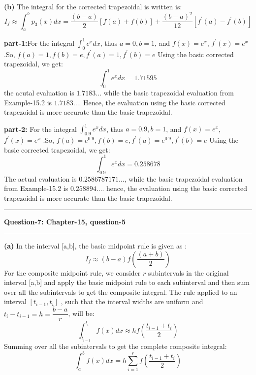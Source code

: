 \documentclass{article}
\newcommand\question[2]{\vspace{.25in}\hrule\textbf{#1: #2}\hrule\vspace{.10in}}
\renewcommand\part[1]{\vspace{.10in}\textbf{(#1)}}
\begin{document}
  \part{b} The integral for the corrected trapezoidal is written is:
  \[ I_f \approx \int_{a}^{b} p_3(x)dx = \dfrac{(b-a)}{2}[f(a) + f(b)] + \dfrac{(b-a)^2}{12}[f^\prime(a) - f^\prime(b)] \]

  \textbf {part-1:}For the integral $\int_{0}^{1}e^x dx$, thus $a=0,b=1$, and $f(x) = e^x$, $f^\prime(x) = e^x$ .So, $f(a)=1,f(b)=e,f^\prime(a)=1, f^\prime(b)=e$ \newline
  Using the basic corrected trapezoidal, we get:
  \[\int_{0}^{1}e^x dx = 1.71595\]
  the acutal evaluation is $1.7183\dots$ while the basic trapezoidal evaluation from Example-15.2 is $1.7183\dots$. Hence, the evaluation using the basic corrected trapezoidal is more accurate than the basic trapezoidal. \newline

  \textbf {part-2:} For the integral $\int_{0.9}^{1}e^x dx$, thus $a=0.9,b=1$, and $f(x) = e^x$, $f^\prime(x) = e^x$ .So, $f(a)=e^{0.9},f(b)=e,f^\prime(a)=e^{0.9}, f^\prime(b)=e$ \newline
  Using the basic corrected trapezoidal, we get:
  \[\int_{0.9}^{1}e^x dx = 0.258678\]
  The actual evaluation is $0.2586787171\dots$, while the basic trapezoidal evaluation from Example-15.2 is $0.258894\dots$. hence, the evaluation using the basic corrected trapezoidal is more accurate than the basic trapezoidal. \newline

  \question{Question-7}{Chapter-15, question-5}
  \part{a} In the interval [a,b], the basic midpoint rule is given as :
  \begin{equation}
	  I_f \approx (b-a)f(\dfrac{(a+b)}{2})
	  \label{eq:bmid}
  \end{equation}
  For the composite midpoint rule, we consider $r$ subintervals in the original interval [a,b] and apply the basic midpoint rule to each subinterval and then sum over all the subintervals to get the composite integral. The rule applied to an interval $[t_{i-1},t_i]$ , such that the interval widths are uniform and $t_i - t_{i-1} = h = \dfrac{b-a}{r}$, will be:
  \[ \int_{t_{i-1}}^{t_i} f(x) dx \approx hf(\dfrac{t_{i-1} + t_i}{2})\]
  Summing over all the subintervals to get the complete composite integral:
  \[ \int_{a}^{b} f(x)dx = h \sum_{i=1}^r f(\dfrac{t_{i-1} + t_i}{2}) \]
\end{document}
